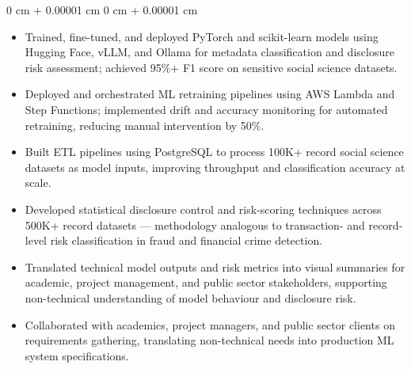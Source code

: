 \documentclass[6pt, letterpaper]{article}
\newenvironment{highlights}{
    \begin{itemize}[
        topsep=0.03 cm,
        parsep=0.03 cm,
        partopsep=0pt,
        itemsep=0pt,
        leftmargin=0 cm + 10pt
    ]
}{
    \end{itemize}
} %
\newenvironment{onecolentry}{
    \begin{adjustwidth}{
        0 cm + 0.00001 cm
    }{
        0 cm + 0.00001 cm
    }
}{
    \end{adjustwidth}
} %
\begin{document}
        \begin{onecolentry}
        \begin{highlights}

            \item Trained, fine-tuned, and deployed PyTorch and scikit-learn models using Hugging Face, vLLM, and Ollama for metadata classification and disclosure risk assessment; achieved 95\%+ F1 score on sensitive social science datasets.
            \item Deployed and orchestrated ML retraining pipelines using AWS Lambda and Step Functions; implemented drift and accuracy monitoring for automated retraining, reducing manual intervention by 50\%.
            \item Built ETL pipelines using PostgreSQL to process 100K+ record social science datasets as model inputs, improving throughput and classification accuracy at scale.
            \item Developed statistical disclosure control and risk-scoring techniques across 500K+ record datasets — methodology analogous to transaction- and record-level risk classification in fraud and financial crime detection.
            \item Translated technical model outputs and risk metrics into visual summaries for academic, project management, and public sector stakeholders, supporting non-technical understanding of model behaviour and disclosure risk.
            \item Collaborated with academics, project managers, and public sector clients on requirements gathering, translating non-technical needs into production ML system specifications.

        \end{highlights}
        \end{onecolentry}
\end{document}
